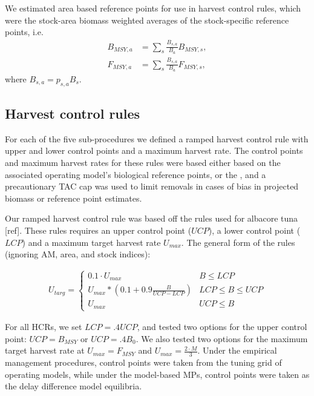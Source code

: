 \documentclass[]{article}
\begin{document}
We estimated area based reference points for use in harvest control
rules, which were the stock-area biomass weighted averages of
the stock-specific reference points, i.e.
\begin{align}
B_{MSY,a} & = \sum_{s} \frac{B_{s,a}}{B_a} B_{MSY,s}, \\
F_{MSY,a} & = \sum_{s} \frac{B_{s,a}}{B_a} F_{MSY,s},
\end{align}
where \(B_{s,a} = p_{s,a} B_s\).

\hypertarget{harvest-control-rules}{%
\subsection{Harvest control rules}\label{harvest-control-rules}}

For each of the five sub-procedures we defined a ramped harvest
control rule with upper and lower control points and a maximum harvest
rate. The control points and maximum harvest rates for these rules were
based either based on the associated operating model's biological reference
points, or the , and a precautionary TAC cap was used to limit removals in
cases of bias in projected biomass or reference point estimates.

Our ramped harvest control rule was based off the rules used for
albacore tuna {[}ref{]}. These rules requires an upper control point (\(UCP\)),
a lower control point (\(LCP\)) and a maximum target harvest rate \(U_{max}\).
The general form of the rules (ignoring AM, area, and stock indices):

\begin{align}
U_{targ} =  \left\{\begin{array}{ll} 
                0.1 \cdot U_{max} & B \leq LCP \\
                U_{max} * (0.1  + 0.9 \frac{B}{UCP - LCP} ) & LCP \leq B \leq UCP \\
                U_{max} & UCP \leq B 
            \end{array} \right.
\end{align}

For all HCRs, we set \(LCP = .4 UCP\), and tested two options for the
upper control point: \(UCP = B_{MSY}\) or \(UCP = .4 B_0\). We also tested
two options for the maximum target harvest rate at \(U_{max} = F_{MSY}\)
and \(U_{max} = \frac{2\cdot M}{3}\). Under the empirical management
procedures, control points were taken from the tuning
grid of operating models, while under the model-based MPs,
control points were taken as the delay difference model
equilibria.
\end{document}
